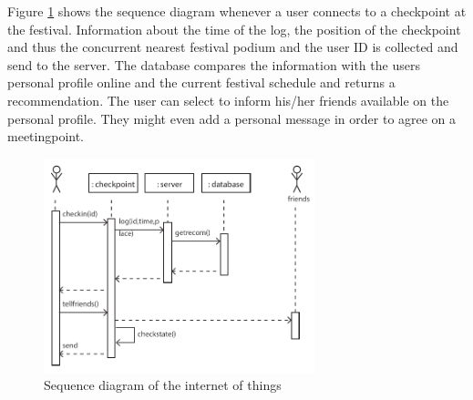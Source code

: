 Figure \ref{fig:sequenceinternet} shows the sequence diagram whenever a user connects to a checkpoint at the festival. Information about the time of the log, the position of the checkpoint and thus the concurrent nearest festival podium and the user ID is collected and send to the server. The database compares the information with the users personal profile online and the current festival schedule and returns a recommendation. The user can select to inform his/her friends available on the personal profile. They might even add a personal message in order to agree on a meetingpoint. 
\begin{figure}[h!]
\centering
\includegraphics[width=0.7\textwidth]{sequenceinternet.pdf}
\caption{Sequence diagram of the internet of things}
\label{fig:sequenceinternet}
\end{figure}
